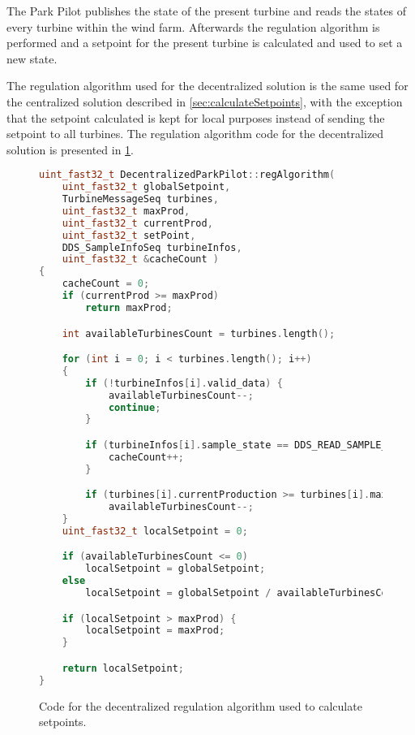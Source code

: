 The Park Pilot publishes the state of the present turbine and reads the states of every turbine within the wind farm. Afterwards the regulation algorithm is performed and a setpoint for the present turbine is calculated and used to set a new state.

The regulation algorithm used for the decentralized solution is the same used for the centralized solution described in \cref{sec:calculateSetpoints}, with the exception that the setpoint calculated is kept for local purposes instead of sending the setpoint to all turbines. The regulation algorithm code for the decentralized solution is presented in \cref{fig:decenRegAlgCode}.

\begin{figure}[!h]
	\centering
	\begin{lstlisting}[language=C++,tabsize=2,basicstyle=\small]
uint_fast32_t DecentralizedParkPilot::regAlgorithm(
	uint_fast32_t globalSetpoint,
	TurbineMessageSeq turbines,
	uint_fast32_t maxProd,
	uint_fast32_t currentProd,
	uint_fast32_t setPoint,
	DDS_SampleInfoSeq turbineInfos,
	uint_fast32_t &cacheCount )
{
	cacheCount = 0;
	if (currentProd >= maxProd)
		return maxProd;

	int availableTurbinesCount = turbines.length();

	for (int i = 0; i < turbines.length(); i++)
	{
		if (!turbineInfos[i].valid_data) {
			availableTurbinesCount--;
			continue;
		}

		if (turbineInfos[i].sample_state == DDS_READ_SAMPLE_STATE) {
			cacheCount++;
		}

		if (turbines[i].currentProduction >= turbines[i].maxProduction)
			availableTurbinesCount--;
	}
	uint_fast32_t localSetpoint = 0;

	if (availableTurbinesCount <= 0)
		localSetpoint = globalSetpoint;
	else
		localSetpoint = globalSetpoint / availableTurbinesCount;

	if (localSetpoint > maxProd) {
		localSetpoint = maxProd;
	}

	return localSetpoint;
}
	\end{lstlisting}
	\caption[The regulation algorithm of the decentralized solution]{
		\label{fig:decenRegAlgCode} 
		\footnotesize{%
			Code for the decentralized regulation algorithm used to calculate setpoints.
		}
	}
\end{figure}

